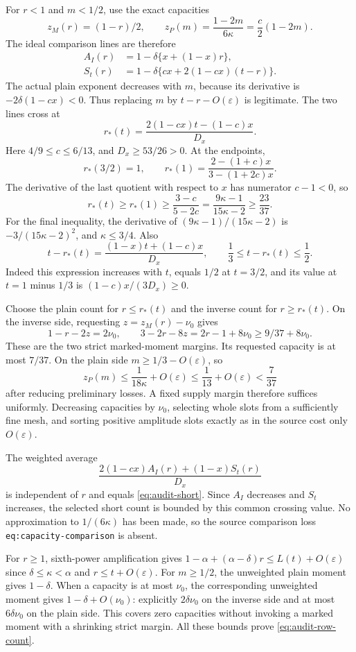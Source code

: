 \documentclass[11pt,a4paper]{article}
\numberwithin{equation}{section}
\theoremstyle{remark}
\begin{document}
For $r<1$ and $m<1/2$, use the exact capacities
\[
 z_M(r)=(1-r)/2,\qquad
 z_P(m)=\frac{1-2m}{6\kappa}=\frac c2(1-2m).
\]
The ideal comparison lines are therefore
\begin{align}
 A_I(r)&=1-\delta\{x+(1-x)r\},\label{eq:audit-AI}\\
 S_t(r)&=1-\delta\{cx+2(1-cx)(t-r)\}.
 \label{eq:audit-SP}
\end{align}
The actual plain exponent decreases with $m$, because its derivative is
$-2\delta(1-cx)<0$.  Thus replacing $m$ by $t-r-O(\varepsilon)$
is legitimate.  The two lines cross at
\begin{equation}\label{eq:audit-crossing}
 r_*(t)=\frac{2(1-cx)t-(1-c)x}{D_x}.
\end{equation}
Here $4/9\le c\le6/13$, and $D_x\ge53/26>0$.
At the endpoints,
\[
 r_*(3/2)=1,\qquad
 r_*(1)=\frac{2-(1+c)x}{3-(1+2c)x}.
\]
The derivative of the last quotient with respect to $x$ has numerator
$c-1<0$, so
\[
 r_*(t)\ge r_*(1)\ge
 \frac{3-c}{5-2c}
 =\frac{9\kappa-1}{15\kappa-2}\ge\frac{23}{37}.
\]
For the final inequality, the derivative of
$(9\kappa-1)/(15\kappa-2)$ is
$-3/(15\kappa-2)^2$, and $\kappa\le3/4$.
Also
\[
 t-r_*(t)=\frac{(1-x)t+(1-c)x}{D_x},\qquad
 \frac13\le t-r_*(t)\le\frac12.
\]
Indeed this expression increases with $t$, equals $1/2$ at $t=3/2$,
and its value at $t=1$ minus $1/3$ is
$(1-c)x/(3D_x)\ge0$.

Choose the plain count for $r\le r_*(t)$ and the inverse count for
$r\ge r_*(t)$.  On the inverse side, requesting
$z=z_M(r)-\nu_0$ gives
\[
 1-r-2z=2\nu_0,\qquad
 3-2r-8z=2r-1+8\nu_0\ge9/37+8\nu_0.
\]
These are the two strict marked-moment margins.  Its requested capacity
is at most $7/37$.  On the plain side $m\ge1/3-O(\varepsilon)$, so
\[
 z_P(m)\le\frac1{18\kappa}+O(\varepsilon)
                         \le\frac1{13}+O(\varepsilon)<\frac7{37}
\]
after reducing preliminary losses.  A fixed supply margin therefore
suffices uniformly.  Decreasing capacities by $\nu_0$, selecting whole
slots from a sufficiently fine mesh, and sorting positive amplitude
slots exactly as in the source cost only $O(\varepsilon)$.

The weighted average
\[
 \frac{2(1-cx)A_I(r)+(1-x)S_t(r)}{D_x}
\]
is independent of $r$ and equals \eqref{eq:audit-short}.
Since $A_I$ decreases and $S_t$ increases, the selected short count is
bounded by this common crossing value.  No approximation to
$1/(6\kappa)$ has been made, so the source comparison loss
\texttt{eq:capacity-comparison} is absent.

For $r\ge1$, sixth-power amplification gives
$1-\alpha+(\alpha-\delta)r\le L(t)+O(\varepsilon)$ since
$\delta\le\kappa<\alpha$ and $r\le t+O(\varepsilon)$.
For $m\ge1/2$, the unweighted plain moment gives $1-\delta$.
When a capacity is at most $\nu_0$, the corresponding unweighted moment
gives $1-\delta+O(\nu_0)$: explicitly $2\delta\nu_0$ on the inverse
side and at most $6\delta\nu_0$ on the plain side.  This covers zero
capacities without invoking a marked moment with a shrinking strict
margin.  All these bounds prove \eqref{eq:audit-row-count}.
\end{document}
